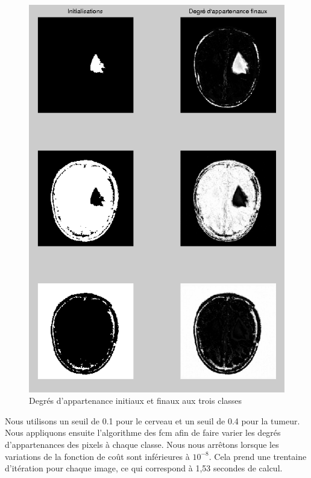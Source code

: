 		\begin{figure}[H]
			\centering
			\includegraphics[height=\textheight]{images/2-fcm_bin.png}
			\caption{Degrés d'appartenance initiaux et finaux aux trois classes}
			\label{fig:fcm_avec_binarisation}
		\end{figure}

		Nous utilisons un seuil de 0.1 pour le cerveau et un seuil de 0.4 pour la tumeur.\\

		Nous appliquons ensuite l'algorithme des fcm afin de faire varier les degrés d'appartenances des pixels à chaque classe. Nous nous arrêtons lorsque les variations de la fonction de coût sont inférieures à $10^{-8}$. Cela prend une trentaine d'itération pour chaque image, ce qui correspond à 1,53 secondes de calcul.


